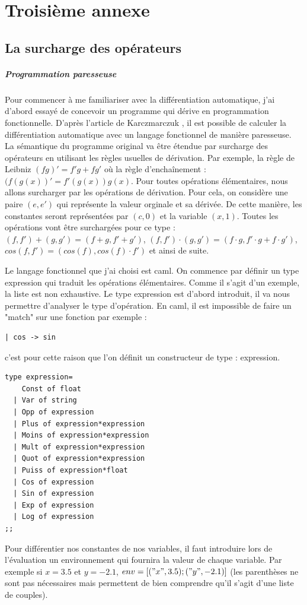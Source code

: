 \chapter{Troisi\`eme annexe}
\label{annexe:C}

\section{La surcharge des op\'erateurs}

\paragraph{Programmation paresseuse}

Pour commencer \`a me familiariser avec la diff\'erentiation automatique, j'ai d'abord essay\'e de 
concevoir un programme qui d\'erive en programmation fonctionnelle. D'apr\`es l'article de Karczmarczuk \cite{paresseuse}, il est possible 
de calculer la diff\'erentiation automatique avec un langage fonctionnel de mani\`ere paresseuse.
La s\'emantique du programme original va être \'etendue par surcharge des op\'erateurs en utilisant
les r\`egles usuelles de d\'erivation. Par exemple, la r\`egle de Leibniz $(fg)'=f'g+fg'$ o\`u la r\`egle
d'encha\^inement : $(f(g(x))'=f'(g(x))g(x)$. Pour toutes op\'erations \'el\'ementaires, nous allons surcharger
par les op\'erations de d\'erivation. Pour cela, on consid\`ere une paire $(e,e')$ qui repr\'esente la valeur
orginale et sa d\'eriv\'ee. De cette mani\`ere, les constantes seront repr\'esent\'ees par $(c,0)$ et la variable
$(x,1)$. Toutes les op\'erations vont être surcharg\'ees pour ce type : $(f,f')+(g,g')=(f+g,f'+g')$, 
$(f,f')\cdot(g,g')=(f\cdot g,f'\cdot g+f\cdot g')$, $cos(f,f')=(cos(f),cos(f)\cdot f')$ et ainsi de suite.

Le langage fonctionnel que j'ai choisi est caml. On commence par d\'efinir un type expression qui traduit les op\'erations \'el\'ementaires. Comme il
 s'agit d'un exemple, la liste est non exhaustive. Le type expression est d'abord introduit, il va nous permettre d'analyser le type d'op\'eration.
En caml, il est impossible de faire un "match" sur une fonction par exemple : \begin{verbatim}| cos -> sin \end{verbatim}
c'est pour cette raison que l'on d\'efinit un constructeur de type : expression. 
{\small
\begin{verbatim}
type expression= 
    Const of float
  | Var of string
  | Opp of expression
  | Plus of expression*expression
  | Moins of expression*expression
  | Mult of expression*expression
  | Quot of expression*expression
  | Puiss of expression*float
  | Cos of expression
  | Sin of expression
  | Exp of expression
  | Log of expression
;;
\end{verbatim}
}
\noindent
Pour diff\'erentier nos constantes de nos variables, il faut introduire lors de l'\'evaluation un
environnement qui fournira la valeur de chaque variable. Par exemple si $x=3.5$ et $y=-2.1$,
$env=[("x",3.5);("y",-2.1)]$ (les parenth\`eses ne sont pas n\'ecessaires mais permettent de bien
comprendre qu'il s'agit d'une liste de couples).


